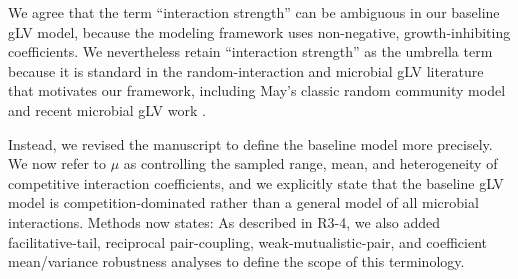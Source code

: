 \responselabel
We agree that the term ``interaction strength'' can be ambiguous in our baseline gLV model, because the modeling framework uses non-negative, growth-inhibiting coefficients. We nevertheless retain ``interaction strength'' as the umbrella term because it is standard in the random-interaction and microbial gLV literature that motivates our framework, including May's classic random community model \citep{May1972} and recent microbial gLV work \citep{Hu2022,Hu2025}.

Instead, we revised the manuscript to define the baseline model more precisely. We now refer to $\mu$ as controlling the sampled range, mean, and heterogeneity of competitive interaction coefficients, and we explicitly state that the baseline gLV model is competition-dominated rather than a general model of all microbial interactions. Methods now states:  As described in R3-4, we also added facilitative-tail, reciprocal pair-coupling, weak-mutualistic-pair, and coefficient mean/variance robustness analyses to define the scope of this terminology.
